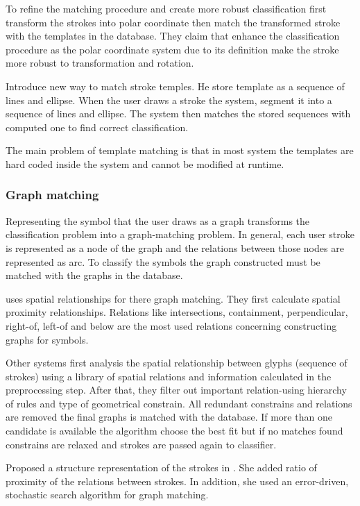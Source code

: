 To refine the matching procedure and create more robust classification \cite {imagetrainable48}  first transform the strokes into polar coordinate then match the transformed stroke with the templates in the database. They claim that enhance the classification procedure as the polar coordinate system due to its definition make the stroke more robust to transformation and rotation.

\cite{templatefrag21}  Introduce new way to match stroke temples. He store template as a sequence of lines and ellipse.  When the user draws a stroke the system, segment it into a sequence of lines and ellipse. The system then matches the stored sequences with computed one to find correct classification.

The main problem of template matching is that in most system the templates are hard coded inside the system and cannot be modified at runtime.


\subsubsection{Graph matching}
\label{sec:Graph matching}

Representing the symbol that the user draws as a graph transforms the classification problem into a graph-matching problem. In general, each user stroke is represented as a node of the graph and the relations between those nodes are represented as arc. To classify the symbols the graph constructed must be matched with the graphs in the database.

\cite{physicalmeaning6} uses spatial relationships for there graph matching. They first calculate spatial proximity relationships. Relations like intersections, containment, perpendicular, right-of, left-of and below are the most used relations concerning constructing graphs for symbols.  

Other systems  first analysis the spatial relationship between glyphs (sequence of strokes) using a library of spatial relations and information calculated in the preprocessing step.  After that, they filter out important relation-using hierarchy of rules and type of geometrical constrain. All redundant constrains and relations are removed the final graphs is matched with the database. If more than one candidate is available the algorithm choose the best fit but if no matches found constrains are relaxed and strokes are passed again to classifier.

 Proposed a structure representation of the strokes in \cite{sketchunderstanding1,HierarchicalParsing7} . She added ratio of proximity of the relations between strokes. In addition, she used an error-driven, stochastic search algorithm for graph matching. 




